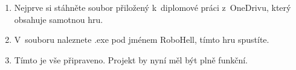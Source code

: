 \begin{enumerate}
\item Nejprve si stáhněte soubor přiložený k~diplomové práci z~OneDrivu, který obsahuje samotnou hru.
\item V~souboru naleznete .exe pod jménem RoboHell, tímto hru spustíte.
\item Tímto je vše připraveno. Projekt by nyní měl být plně funkční.
\end{enumerate}